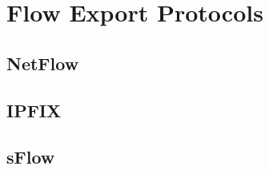 \chapter{Flow Export Protocols}\label{ch:flow-export-protocols}

\section{NetFlow}\label{sec:netflow}
\section{IPFIX}\label{sec:ipfix}
\section{sFlow}\label{sec:sflow}